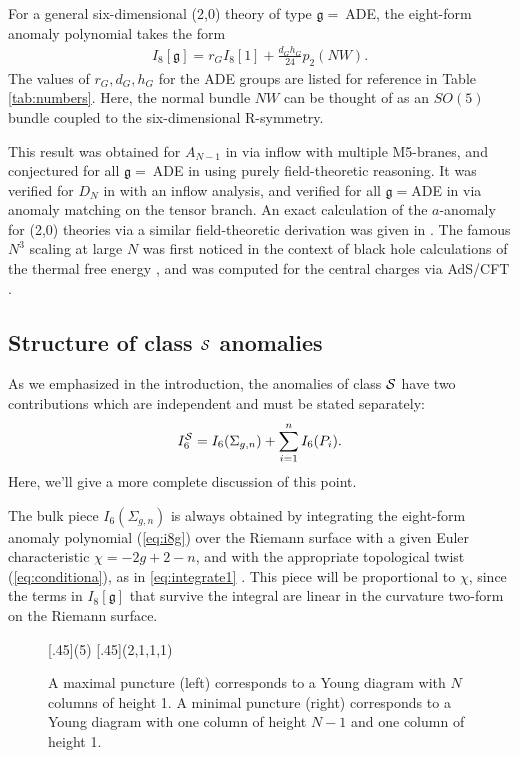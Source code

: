 \documentclass[a4paper,11pt]{article}
\newcommand{\ba}[1]{\begin{align} #1 \end{align} }
\def\CS{{\cal S}}
\begin{document}
For a general six-dimensional (2,0) theory of type $\mathfrak{g}=\ $ADE, the eight-form anomaly polynomial takes the form
	\ba{
	I_8[\mathfrak{g}] = r_G I_8[1] + \frac{d_Gh_G}{24} p_2(NW).\label{eq:i8g}
	}
The values of $r_G,d_G,h_G$ for the ADE groups are listed for reference in Table \ref{tab:numbers}. Here, the normal bundle $NW$ can be thought of as an $SO(5)$ bundle coupled to the six-dimensional R-symmetry. 

This result was obtained for $A_{N-1}$ in \cite{Harvey:1998bx} via inflow with multiple M5-branes, and conjectured for all $\mathfrak{g}=\ $ADE in  \cite{Intriligator:2000eq} using purely field-theoretic reasoning. It was verified for $D_N$ in \cite{Yi:2001bz} with an inflow analysis, and verified for all $\mathfrak{g}=$ADE in \cite{Ohmori:2014kda} via anomaly matching on the tensor branch.  An exact calculation of the $a$-anomaly for (2,0) theories via a similar field-theoretic derivation was given in  \cite{Cordova:2015vwa}. The famous $N^3$ scaling at large $N$ was first noticed in the context of black hole calculations of the thermal free energy \cite{Klebanov:1996un}, and was computed for the central charges via AdS/CFT \cite{Henningson:1998gx}.



\subsection{Structure of class $\CS$ anomalies}%
\label{sec:gens}



As we emphasized in the introduction, the anomalies of class $\CS$ have two contributions which are independent and must be stated separately:
	\ba{
	I_6^{\CS}=I_6(\Sigma_{g,n}) + \sum_{i=1}^n I_6(P_i).\label{eq:cs}
	}
Here, we'll give a more complete discussion of this point.

The bulk piece $I_6(\Sigma_{g,n})$ is always obtained by integrating the eight-form anomaly polynomial (\ref{eq:i8g}) over the Riemann surface with a given Euler characteristic $\chi=-2g+2-n$, and with the appropriate topological twist (\ref{eq:conditiona}), as in \eqref{eq:integrate1} \cite{Bah:2012dg,Bah:2011vv,Alday:2009qq}.
This piece will be proportional to $\chi$, since the terms in $I_8[\mathfrak{g}]$ that survive the integral are linear in the curvature two-form on the Riemann surface. 



	\begin{figure}[t!]
	\centering
	  [.45\linewidth]{\yng(5)}
	  [.45\linewidth]{\yng(2,1,1,1)}
 	 \caption{A maximal puncture (left) corresponds to a Young diagram with $N$ columns of height 1. A minimal puncture (right) corresponds to a Young diagram with one column of height $N-1$ and one column of height 1.\label{fig:puncs}}
	\end{figure}
	
\end{document}
